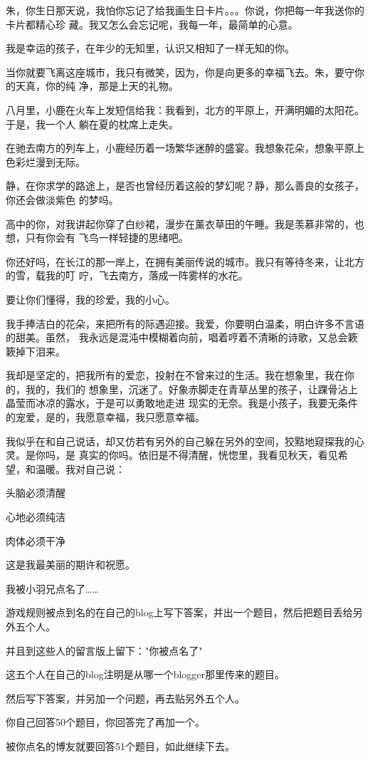 \documentclass[12pt,a4paper]{article}
\def\blankrev{\vspace{1ex}}									%
\begin{document}
		朱，你生日那天说，我怕你忘记了给我画生日卡片。。。你说，你把每一年我送你的卡片都精心珍
	藏。我又怎么会忘记呢，我每一年，最简单的心意。

		我是幸运的孩子，在年少的无知里，认识又相知了一样无知的你。

		当你就要飞离这座城市，我只有微笑，因为，你是向更多的幸福飞去。朱，要守你的天真，你的纯
	净，那是上天的礼物。


		\blankrev
		八月里，小鹿在火车上发短信给我：我看到，北方的平原上，开满明媚的太阳花。于是，我一个人
	躺在夏的枕席上走失。

		在驰去南方的列车上，小鹿经历着一场繁华迷醉的盛宴。我想象花朵，想象平原上色彩烂漫到无际。

		静，在你求学的路途上，是否也曾经历着这般的梦幻呢？静，那么善良的女孩子，你还会做淡紫色
	的梦吗。

		高中的你，对我讲起你穿了白纱裙，漫步在薰衣草田的午睡。我是羡慕非常的，也想，只有你会有
	飞鸟一样轻捷的思绪吧。

		你还好吗，在长江的那一岸上，在拥有美丽传说的城市。我只有等待冬来，让北方的雪，载我的叮
	咛，飞去南方，落成一阵雾样的水花。


		\blankrev
		要让你们懂得，我的珍爱，我的小心。

		我手捧洁白的花朵，来把所有的际遇迎接。我爱，你要明白温柔，明白许多不言语的甜美。虽然，
	我永远是混沌中模糊着向前，唱着哼着不清晰的诗歌，又总会簌簌掉下泪来。

		我却是坚定的，把我所有的爱恋，投射在不曾来过的生活。我在想象里，我在你的，我的，我们的
	想象里，沉迷了。好象赤脚走在青草丛里的孩子，让踝骨沾上晶莹而冰凉的露水，于是可以勇敢地走进
	现实的无奈。我是小孩子，我要无条件的宠爱，是的，我愿意幸福，我只愿意幸福。

		我似乎在和自己说话，却又仿若有另外的自己躲在另外的空间，狡黠地窥探我的心灵。是你吗，是
	真实的你吗。依旧是不得清醒，恍惚里，我看见秋天，看见希望，和温暖。我对自己说：

		\blankrev
		头脑必须清醒 \par
		心地必须纯洁 \par
		肉体必须干净

		这是我最美丽的期许和祝愿。

	\endwriting



		我被小羽兄点名了……

		游戏规则被点到名的在自己的blog上写下答案，并出一个题目，然后把题目丢给另外五个人。\par
		并且到这些人的留言版上留下："你被点名了"\par
		这五个人在自己的blog注明是从哪一个blogger那里传来的题目。\par
		然后写下答案，并另加一个问题，再去贴另外五个人。\par
		你自己回答50个题目，你回答完了再加一个。\par
		被你点名的博友就要回答51个题目，如此继续下去。
\end{document}
